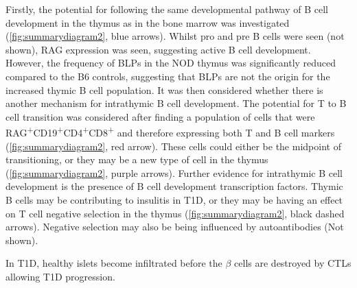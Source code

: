 Firstly, the potential for following the same developmental pathway of B cell development in the thymus as in the bone marrow was investigated (\cref{fig:summarydiagram2}, blue arrows).
Whilst pro and pre B cells were seen (not shown), RAG expression was seen, suggesting active B cell development.
However, the frequency of BLPs in the NOD thymus was significantly reduced compared to the B6 controls, suggesting that BLPs are not the origin for the increased thymic B cell population.
It was then considered whether there is another mechanism for intrathymic B cell development.
The potential for T to B cell transition was considered after finding a population of cells that were RAG\textsuperscript{+}CD19\textsuperscript{+}CD4\textsuperscript{+}CD8\textsuperscript{+} and therefore expressing both T and B cell markers (\cref{fig:summarydiagram2}, red arrow).
These cells could either be the midpoint of transitioning, or they may be a new type of cell in the thymus (\cref{fig:summarydiagram2}, purple arrows).
Further evidence for intrathymic B cell development is the presence of B cell development transcription factors.
Thymic B cells may be contributing to insulitis in T1D, or they may be having an effect on T cell negative selection in the thymus (\cref{fig:summarydiagram2}, black dashed arrows).
Negative selection may also be being influenced by autoantibodies (Not shown).

In T1D, healthy islets become infiltrated before the $\beta$ cells are destroyed by CTLs allowing T1D progression.


